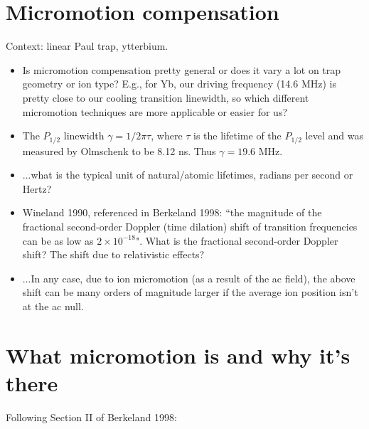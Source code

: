 \documentclass{article}
\begin{document}
\section*{Micromotion compensation}

Context: linear Paul trap, ytterbium. 

\begin{itemize}
\item Is micromotion compensation pretty general or does it vary a lot on trap geometry or ion type? E.g., for Yb, our driving frequency (14.6 MHz) is pretty close to our cooling transition linewidth, so which different micromotion techniques are more applicable or easier for us? 

\item The $P_{1/2}$ linewidth $\gamma = 1/2 \pi \tau$, where $\tau$ is the lifetime of the $P_{1/2}$ level and was measured by Olmschenk to be 8.12 ns. Thus $\gamma = 19.6$ MHz.

\item ...what is the typical unit of natural/atomic lifetimes, radians per second or Hertz?
\item Wineland 1990, referenced in Berkeland 1998: ``the magnitude of the fractional second-order Doppler (time dilation) shift of transition frequencies can be as low as $2 \times 10^{-18}$". What is the fractional second-order Doppler shift? The shift due to relativistic effects?

\item ...In any case, due to ion micromotion (as a result of the ac field), the above shift can be many orders of magnitude larger if the average ion position isn't at the ac null.
\end{itemize}


\section{What micromotion is and why it's there}

Following Section II of Berkeland 1998:
\end{document}

